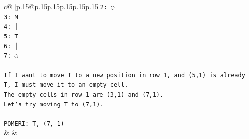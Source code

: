 \documentclass{article}
\begin{document}
{\begin{supertabular}{c@{$\;$}|p{.15\linewidth}@{}p{.15\linewidth}p{.15\linewidth}p{.15\linewidth}p{.15\linewidth}p{.15\linewidth}}
{{{\texttt{2: ◌} \\
\texttt{3: M} \\
\texttt{4: │} \\
\texttt{5: T} \\
\texttt{6: │} \\
\texttt{7: ◌} \\
\\ 
\texttt{If I want to move T to a new position in row 1, and (5,1) is already T, I must move it to an empty cell.} \\
\texttt{The empty cells in row 1 are (3,1) and (7,1).} \\
\texttt{Let's try moving T to (7,1).} \\
\\ 
\texttt{POMERI: T, (7, 1)} \\
            }
        }
    }
    & & \\ \\


\end{supertabular}}
\end{document}
